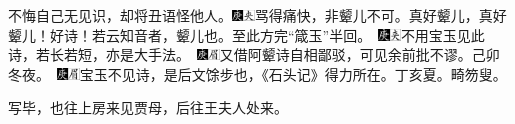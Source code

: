{不悔自己无见识，却将丑语怪他人。{\includegraphics[width=3mm]{../Images/00004}\includegraphics[width=3mm]{../Images/00012}\footnotesize \kaishu 骂得痛快，非颦儿不可。真好颦儿，真好颦儿！好诗！若云知音者，颦儿也。至此方完``箴玉''半回。　{\includegraphics[width=3mm]{../Images/00004}\includegraphics[width=3mm]{../Images/00012}\footnotesize \kaishu 不用宝玉见此诗，若长若短，亦是大手法。　\includegraphics[width=3mm]{../Images/00004}\includegraphics[width=3mm]{../Images/00010}\footnotesize \kaishu 又借阿颦诗自相鄙驳，可见余前批不谬。己卯冬夜。　\includegraphics[width=3mm]{../Images/00004}\includegraphics[width=3mm]{../Images/00010}\footnotesize \kaishu 宝玉不见诗，是后文馀步也，《石头记》得力所在。丁亥夏。畸笏叟。}}

写毕，也往上房来见贾母，后往王夫人处来。

}
